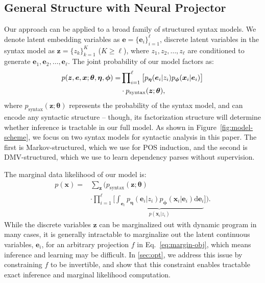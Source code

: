 \documentclass[11pt,a4paper]{article}
\begin{document}
\subsection{General Structure with Neural Projector}
\label{sec:general-neural}
Our approach can be applied to a broad family of structured syntax models. We denote latent embedding variables as $\bm{e}=\{\bm{e}_i\}_{i=1}^{\ell}$, discrete latent variables in the syntax model as $\bm{z}=\{z_k\}_{k=1}^K$ ($K \geqslant \ell$), where $z_1, z_2, \ldots, z_{\ell}$ are conditioned to generate $\bm{e}_1, \bm{e}_2, \ldots, \bm{e}_{\ell}$. The joint probability of our model factors as:
\vspace{-1mm}
\begin{equation}
\label{eq:prob-general}
\begin{split}
p(\bm{z}, \bm{e}, \bm{x}; \bm{\theta}, \bm{\eta}, \bm{\phi}) =& \prod\nolimits_{i=1}^{\ell}\big[p_{\bm{\eta}}(\bm{e}_i | z_i)p_{\bm{\phi}}(\bm{x}_i | \bm{e}_i)\big] \\
& \cdot p_{\text{syntax}}(\bm{z}; \bm{\theta}),
\end{split}
\raisetag{0.9\baselineskip}
\end{equation}
where $p_{\text{syntax}}(\bm{z}; \bm{\theta})$ represents the probability of the syntax model, and can encode any syntactic structure -- though, its factorization structure will determine whether inference is tractable in our full model.
As shown in Figure~\ref{fig:model-scheme}, we focus on two syntax models for syntactic analysis in this paper. The first is Markov-structured, which we use for POS induction, and the second is DMV-structured, which we use to learn dependency parses without supervision. 

The marginal data likelihood of our model is:
\begin{equation}
\label{eq:margin-obj}
\begin{split}
p(\bm{x}) = &\sum\nolimits_{\bm{z}}\Big(p_{\text{syntax}}(\bm{z}; \bm{\theta}) \\
&\cdot  \prod\nolimits_{i=1}^{\ell}\big[\underbrace{\int_{\bm{e}_i}p_{\bm{\eta}}(\bm{e}_i | z_i)p_{\bm{\phi}}(\bm{x}_i | \bm{e}_i)\text{d}\bm{e}_i}_{p(\bm{x}_i | z_i)}\big]\Big).
\end{split}
\end{equation}
While the discrete variables $\bm{z}$ can be marginalized out with dynamic program in many cases, it is generally intractable to marginalize out the latent continuous variables, $\bm{e}_i$, for an arbitrary projection $f$ in Eq.~\eqref{eq:margin-obj}, which means inference and learning may be difficult.
In \cref{sec:opt}, we address this issue by constraining $f$ to be invertible, and show that this constraint enables tractable exact inference and marginal likelihood computation.
\end{document}

